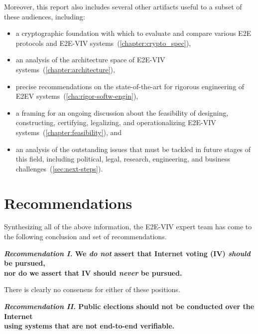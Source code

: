 Moreover, this report also includes several other artifacts useful to
a subset of these audiences, including:
\begin{itemize}
\item a cryptographic foundation with which to evaluate and compare
  various E2E protocols and E2E-VIV
  systems~(\autoref{chapter:crypto_spec}),
\item an analysis of the architecture space of E2E-VIV
  systems~(\autoref{chapter:architecture}),
\item precise recommendations on the state-of-the-art for rigorous
  engineering of E2EV systems~(\autoref{cha:rigor-softw-engin}),
\item a framing for an ongoing discussion about the feasibility of
  designing, constructing, certifying, legalizing, and operationalizing
  E2E-VIV systems~(\autoref{chapter:feasibility}), and
\item an analysis of the outstanding issues that must be tackled in
  future stages of this field, including political, legal, research,
  engineering, and business challenges~(\autoref{sec:next-steps}).
\end{itemize}

\section{Recommendations}

Synthesizing all of the above information, the E2E-VIV expert team has
come to the following conclusion and set of
recommendations. 

\begin{center}
  \textbf{\emph{Recommendation I.} We \emph{do not} assert that
    Internet voting (IV) \emph{should} be pursued,\\
    nor do we assert that IV should \emph{never} be pursued.}
\end{center}

There is clearly no consensus for either of these positions.

\begin{center}
  \textbf{\emph{Recommendation II.} Public elections should not be
    conducted over the Internet\\
    using systems that are not end-to-end verifiable.}
\end{center}

